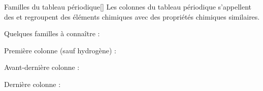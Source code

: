\begin{doc}{Familles du tableau périodique}[\label{doc:familles}]
  Les colonnes du tableau périodique s'appellent des  et regroupent des éléments chimiques avec des propriétés chimiques similaires.
  \begin{importants}
    Quelques familles à connaître : 
    \begin{listePoints}
      \item Première colonne (sauf hydrogène) : 
      \item Avant-dernière colonne : 
      \item Dernière colonne : 
    \end{listePoints}
  \end{importants}
\end{doc}

